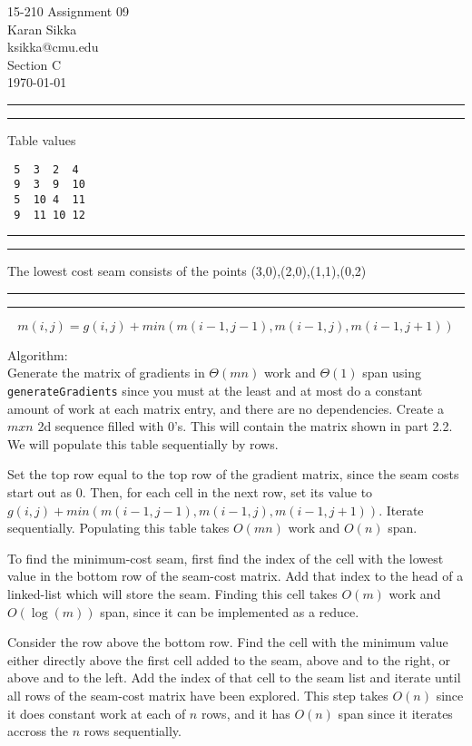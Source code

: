 \documentclass[11pt,letterpaper]{article}
\makeatletter
\newcommand{\question}[2] {\vspace{.25in} \hrule\vspace{0.5em}
\noindent{\bf #1: #2} \vspace{0.5em}
\hrule \vspace{.10in}}
\newcommand{\myname}{Karan Sikka}
\newcommand{\myandrew}{ksikka@cmu.edu}
\newcommand{\myhwnum}{09}
\makeatother
\begin{document}
\medskip

\thispagestyle{plain}
\begin{center}                  %
{\Large 15-210 Assignment \myhwnum} \\
\myname \\
\myandrew \\
Section C\\
\today\\
\end{center}


\question{1}{Task 2.2}

Table values
\begin{verbatim}
 5  3  2  4
 9  3  9  10
 5  10 4  11
 9  11 10 12
\end{verbatim}

\question{2}{Task 2.3}
The lowest cost seam consists of the points
(3,0),(2,0),(1,1),(0,2)

\question{3}{Task 2.4}
$$ m(i,j) = g(i,j) + min(m(i-1,j-1),m(i-1,j),m(i-1,j+1)) $$

Algorithm:\\
Generate the matrix of gradients in $\Theta(mn)$ work and $\Theta(1)$
span using \verb|generateGradients| since you must at the least
and at most do a constant amount of work at each matrix entry, and
there are no dependencies.
Create a $m x n$ 2d sequence filled with 0's. This
will contain the matrix shown in part 2.2. We will populate
this table sequentially by rows.

Set the top row equal to the top row of the gradient matrix,
since the seam costs start out as 0.
Then, for each cell in the next row, set its value to
$g(i,j) + min(m(i-1,j-1),m(i-1,j),m(i-1,j+1)) $.
Iterate sequentially. Populating this table takes $O(mn)$ work
and $O(n)$ span.

To find the minimum-cost seam, first find the index of the
cell with the lowest value in the bottom row of the seam-cost matrix. 
Add that index to the head of a linked-list which will store the seam.
Finding this cell takes $O(m)$
work and $O(\log(m))$ span, since it can be implemented as a reduce.

Consider the row above the bottom row. Find the cell with the
minimum value either directly above the first cell added to the seam,
above and to the right, or above and to the left. Add the index
of that cell to the seam list and iterate until all rows
of the seam-cost matrix have been explored. This step takes $O(n)$
since it does constant work at each of $n$ rows, and it has $O(n)$
span since it iterates accross the $n$ rows sequentially.
\end{document}
